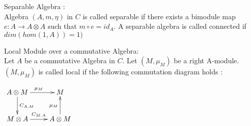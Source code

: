 \begin{defn}
 Separable Algebra :\\
 Algebra $(A, m, \eta)$ in $C$ is called separable if there exists a bimodule map $e : A \rightarrow A \otimes A$ such that  
$ m \circ e = id_{A}$. A separable algebra is called connected if $dim(hom(1,A)) = 1)$
\end{defn}

\begin{defn}
 Local Module over a commutative Algebra:\\
      Let $A$ be a commutative Algebra in $C$. Let $(M, \mu_{M})$ be a right A-module. $(M, \mu_{M})$ is called local if the following
      commutation diagram holds :
      \begin{center}
	    $\xymatrix{
	    A \otimes M \ar[r]^{\mu_{M}} \ar[d]^{C_{A,M}} & M \\
	    M \otimes A \ar[r]^{C_{M,A}} & A \otimes M \ar[u]^{\mu_{M}} 
	    }$
      \end{center}
\end{defn}
